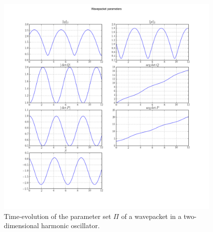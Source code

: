 \begin{figure}
  \centering
  \includegraphics[width=\linewidth]{./results/HO/wavepacket_parameters_abs_ang_block0.png}
  \caption{Time-evolution of the parameter set $\Pi$ of a wavepacket in a
           two-dimensional harmonic oscillator.}
  \label{fig:ho_parameters}
\end{figure}

